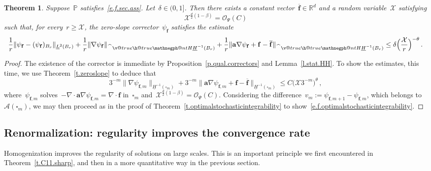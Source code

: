 \documentclass[11pt,twoside]{article} %
\makeatletter
\let\oldsquare\square %
\renewcommand{\square}{\oldsquare}
\numberwithin{equation}{section}
\newtheorem{theorem}{Theorem}[section]
\theoremstyle{definition}
\newcommand*{\Rd}{\ensuremath{\mathbb{R}^d}}
\renewcommand*{\hat}{\widehat}
\newcommand{\f}{\mathbf{f}}
\renewcommand{\a}{\mathbf{a}}
\newcommand{\cu}{\square}
\renewcommand{\P}{\mathbb{P}}
\newcommand{\X}{\mathcal{X}}
\renewcommand{\O}{\mathcal{O}}
\newcommand{\negphantom}{\v@true\h@true\negph@nt}
\newcommand{\negph@nt}{\ifmmode\expandafter\mathpalette 
  \expandafter\mathnegph@nt\else\expandafter\makenegph@nt\fi}
\newcommand{\makenegph@nt}[1]{%
  \setbox\z@\hbox{\color@begingroup#1\color@endgroup}\finnegph@nt}
\newcommand{\finnegph@nt}{%
  \setbox\tw@\null 
  \ifv@ \ht\tw@\ht\z@\dp\tw@\dp\z@\fi \ifh@\wd\tw@-\wd\z@\fi\box\tw@}
\newcommand{\mathnegph@nt}[2]{%
  \setbox\z@\hbox{$\m@th #1{#2}$}\finnegph@nt}
\newcommand{\Hminusul}{\hat{\phantom{H}}\negphantom{H}\underline{H}^{-1}}
\newcommand{\A}{\mathcal{A}}
\makeatother
\begin{document}
\begin{theorem}
\label{t.f.optimalstochasticintegrability}
Suppose~$\P$ satisfies~\eqref{e.f.sec.ass}. Let~$\delta \in (0,1]$. 
Then there exists a constant vector~$\overline{\f}\in
\Rd$  and a random variable~$\X$ satisfying   
\begin{equation} \label{e.f.X.integrability}
\X^{\frac d2(1-\beta)} = \O_\Psi(C)
\end{equation}
such that, for every~$r \geq \X$, the zero-slope corrector~$\psi_{\f}$ satisfies the estimate
\begin{equation}  \label{e.f.optimalstochasticintegrability}
\frac1r \|\psi_{\f} - (\psi_{\f})_{B_r} \|_{\underline{L}^2(B_r)}
+
\frac1r \|\nabla \psi_{\f} \|_{\Hminusul(B_r)} +  \frac1r \|\a \nabla \psi_{\f} + \f - \overline{\f} \|_{\Hminusul(B_r)} 
\leq 
\delta \Bigl(\frac{\X}{r} \Bigr)^{-\theta}\,.
\end{equation}
\end{theorem}
\begin{proof}
The existence of the corrector is immediate by Proposition~\ref{p.qual.correctors} and Lemma~\ref{l.stat.HH}. To show the estimates, this time, we use Theorem~\ref{t.zeroslope} to deduce that 
\begin{equation*}  
3^{-m}\bigl\| \nabla \psi_{\f,m} \bigr\|_{\underline{H}^{-1}(\cu_m)} 
+
3^{-m} \bigl\| \a \nabla \psi_{\f,m} + \f - \overline{\f} \bigr\|_{\underline{H}^{-1}(\cu_m)} 
\leq 
C  \bigl( \X 3^{-m} \bigr)^{\theta}
\,,
\end{equation*}
where~$\psi_{\f,m}$ solves~$-\nabla \cdot \a \nabla \psi_{\f,m} = \nabla \cdot \f$ in~$\cu_m$ and~$\X^{\frac d2(1-\beta)} = \O_\Psi(C)$.  Considering the difference~$v_{m} := \psi_{\f,m+1}-\psi_{\f,m}$, which belongs to~$\A(\cu_m)$, we may then proceed as in the proof of Theorem~\ref{t.optimalstochasticintegrability} to show~\eqref{e.f.optimalstochasticintegrability}. 
\end{proof}


\subsection{Renormalization: regularity improves the convergence rate}
\label{ss.almostone} 

Homogenization improves the regularity of solutions on large scales. This is an important principle we first encountered in Theorem~\ref{t.C11.sharp}, and then in a more quantitative way in the previous section. 

\smallskip 
\end{document}
